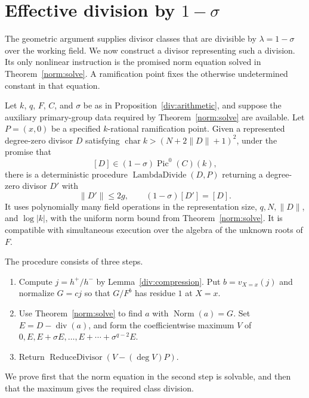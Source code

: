\section{Effective division by \texorpdfstring{$1-\sigma$}{1-sigma}}
\label{sec:division}

The geometric argument supplies divisor classes that are divisible by
$\lambda=1-\sigma$ over the working field.  We now construct a divisor
representing such a division.  Its only nonlinear instruction is the
promised norm equation solved in Theorem~\ref{norm:solve}.  A
ramification point fixes the otherwise undetermined constant in that
equation.

\begin{samepage}
\begin{proposition}\label{div:divide}
Let $k$, $q$, $F$, $C$, and $\sigma$ be as in
Proposition~\ref{div:arithmetic}, and suppose the auxiliary primary-group
data required by Theorem~\ref{norm:solve} are available.  Let $P=(x,0)$
be a specified $k$-rational ramification point.  Given a represented
degree-zero divisor $D$ satisfying
$\operatorname{char}k>(N+2\|D\|+1)^2$, under the promise that
\[
 [D]\in(1-\sigma)\operatorname{Pic}^0(C)(k),
\]
there is a deterministic procedure $\operatorname{LambdaDivide}(D,P)$
returning a degree-zero divisor $D'$ with
\[
 \|D'\|\leq2g,\qquad (1-\sigma)[D']=[D].
\]
It uses polynomially many field operations in the representation size,
$q,N,\|D\|$, and $\log|k|$, with the uniform norm bound from
Theorem~\ref{norm:solve}.  It is compatible with simultaneous
execution over the algebra of the unknown roots of $F$.
\end{proposition}
\end{samepage}

The procedure consists of three steps.
\begin{enumerate}
\item Compute $j=h^+/h^-$ by Lemma~\ref{div:compression}.  Put
$b=v_{X=x}(j)$ and normalize $G=cj$ so that $G/F^b$ has residue $1$
at $X=x$.
\item Use Theorem~\ref{norm:solve} to find $a$ with
$\operatorname{Norm}(a)=G$.  Set $E=D-\operatorname{div}(a)$, and form
the coefficientwise maximum $V$ of
$0,E,E+\sigma E,\ldots,E+\cdots+\sigma^{q-2}E$.
\item Return $\operatorname{ReduceDivisor}(V-(\deg V)P)$.
\end{enumerate}
We prove first that the norm equation in the second step is solvable,
and then that the maximum gives the required class division.


